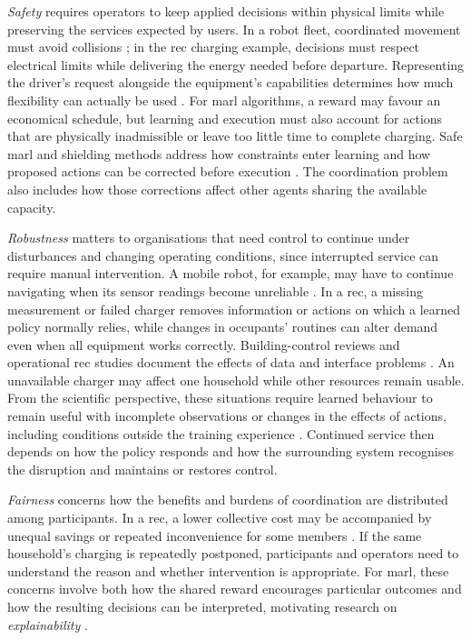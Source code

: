 \emph{Safety} requires operators to keep applied decisions within physical limits while preserving the services expected by users. In a robot fleet, coordinated movement must avoid collisions \parencite{orr2023multirobot}; in the \gls{rec} charging example, decisions must respect electrical limits while delivering the energy needed before departure. Representing the driver's request alongside the equipment's capabilities determines how much flexibility can actually be used \parencite{hussain2023flexibility,siksnys2019flexoffers}. For \gls{marl} algorithms, a reward may favour an economical schedule, but learning and execution must also account for actions that are physically inadmissible or leave too little time to complete charging. Safe \gls{marl} and shielding methods address how constraints enter learning and how proposed actions can be corrected before execution \parencite{gu2023safemarl,elsayedaly2021shielding}. The coordination problem also includes how those corrections affect other agents sharing the available capacity.

\emph{Robustness} matters to organisations that need control to continue under disturbances and changing operating conditions, since interrupted service can require manual intervention. A mobile robot, for example, may have to continue navigating when its sensor readings become unreliable \parencite{dulacarnold2021realworld}. In a \gls{rec}, a missing measurement or failed charger removes information or actions on which a learned policy normally relies, while changes in occupants' routines can alter demand even when all equipment works correctly. Building-control reviews and operational \gls{rec} studies document the effects of data and interface problems \parencite{kannari2025realbuildings,fonseca2025realworldrec}. An unavailable charger may affect one household while other resources remain usable. From the scientific perspective, these situations require learned behaviour to remain useful with incomplete observations or changes in the effects of actions, including conditions outside the training experience \parencite{dulacarnold2021realworld}. Continued service then depends on how the policy responds and how the surrounding system recognises the disruption and maintains or restores control.

\emph{Fairness} concerns how the benefits and burdens of coordination are distributed among participants. In a \gls{rec}, a lower collective cost may be accompanied by unequal savings or repeated inconvenience for some members \parencite{moret2019energycollectives}. If the same household's charging is repeatedly postponed, participants and operators need to understand the reason and whether intervention is appropriate. For \gls{marl}, these concerns involve both how the shared reward encourages particular outcomes \parencite{albrecht2024marl} and how the resulting decisions can be interpreted, motivating research on \emph{explainability} \parencite{bekkemoen2024xrl}.

